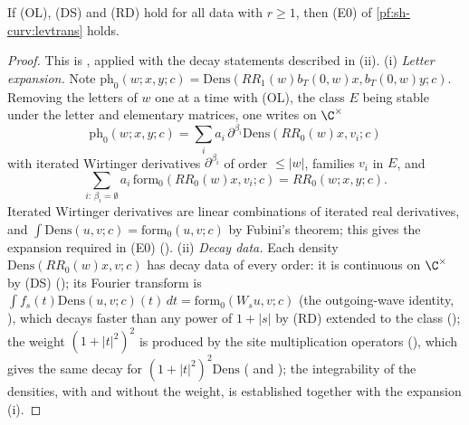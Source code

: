 \begin{proposition}\label{pf:sh-curv:stepexp}
If (OL), (DS) and (RD) hold for all data with $r\ge1$, then (E0) of \cref{pf:sh-curv:levtrans} holds.
\end{proposition}

\begin{proof}
This is , applied with the decay statements described in (ii).
(i) \emph{Letter expansion.} Note $\mathrm{ph}_0(w;x,y;c)=\mathrm{Dens}(RR_1(w)b_T(0,w)x,b_T(0,w)y;c)$. Removing the letters of
$w$ one at a time with (OL), the class $E$ being stable under the letter and elementary matrices, one writes on $\C^\times$
\[
\mathrm{ph}_0(w;x,y;c)=\sum_ia_i\,\partial^{\beta_i}\mathrm{Dens}(RR_0(w)x,v_i;c)
\]
with iterated Wirtinger derivatives $\partial^{\beta_i}$ of order $\le|w|$, families $v_i$ in $E$, and
\[
\sum_{i:\,\beta_i=\emptyset}a_i\,\mathrm{form}_0(RR_0(w)x,v_i;c)=RR_0(w;x,y;c).
\]
Iterated Wirtinger derivatives are linear
combinations of iterated real derivatives, and $\int\mathrm{Dens}(u,v;c)=\mathrm{form}_0(u,v;c)$ by Fubini's theorem; this gives
the expansion required in (E0) ().
(ii) \emph{Decay data.} Each density $\mathrm{Dens}(RR_0(w)x,v;c)$ has decay data of every order: it is continuous on
$\C^\times$ by (DS) (); its Fourier transform is
$\int f_s(t)\mathrm{Dens}(u,v;c)(t)\,dt=\mathrm{form}_0(W_su,v;c)$ (the outgoing-wave identity,
), which decays faster than any power of $1+|s|$ by (RD)
extended to the class (); the weight $(1+|t|^2)^2$ is produced by the
site multiplication operators (), which gives the same
decay for $(1+|t|^2)^2\mathrm{Dens}$ ( and );
the integrability of the densities, with and without the weight, is established together with the expansion (i).
\end{proof}

